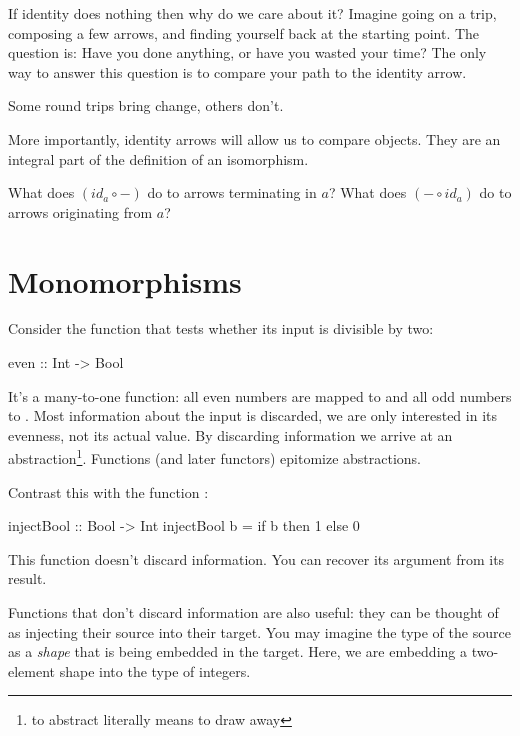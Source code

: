 \documentclass[DaoFP]{subfiles}
\begin{document}
If identity does nothing then why do we care about it? Imagine going on a trip, composing a few arrows, and finding yourself back at the starting point. The question is: Have you done anything, or have you wasted your time? The only way to answer this question is to compare your path to the identity arrow. 

Some round trips bring change, others don't.

More importantly, identity arrows will allow us to compare objects. They are an integral part of the definition of an isomorphism.

\begin{exercise}\label{ex-yoneda-identity}
What does $(id_a \circ -)$ do to arrows terminating in $a$? What does $(- \circ id_a)$ do to arrows originating from $a$?
\end{exercise}

\section{Monomorphisms}

Consider the function  that tests whether its input is divisible by two:
\begin{haskell}
even :: Int -> Bool
\end{haskell}
It's a many-to-one function: all even numbers are mapped to  and all odd numbers to . Most information about the input is discarded, we are only interested in its evenness, not its actual value. By discarding information we arrive at an abstraction\footnote{to abstract literally means to draw away}. Functions (and later functors) epitomize abstractions.

Contrast this with the function :
\begin{haskell}
injectBool :: Bool -> Int
injectBool b = if b then 1 else 0
\end{haskell}
This function doesn't discard information. You can recover its argument from its result. 

Functions that don't discard information are also useful: they can be thought of as injecting their source into their target. You may imagine the type of the source as a \emph{shape} that is being embedded in the target. Here, we are embedding a two-element shape  into the type of integers. 
\end{document}

